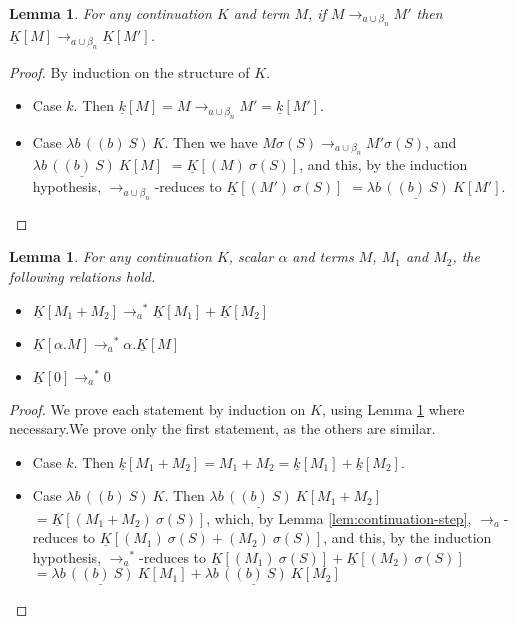 \documentclass{LMCS}
\newtheorem{lemma}[theorem]{Lemma}
\newcommand{\xto}[1]{\ensuremath{\rightarrow_{#1}}}
\newcommand{\toalgred}{\xto{a}}
\newcommand{\stoalgred}{\ensuremath{\xto{a}^{\ast}}}
\newcommand{\tobalgred}{\xto{a\cup\beta_n}}
\begin{document}
\begin{lemma}
  \label{lem:continuation-step-a}For any continuation $K$ and term
  $M$, if $M\tobalgred M'$ then $\underline{K}[M]\tobalgred\underline{K}[M']$.
\end{lemma}
\begin{proof}
  By induction on the structure of $K$.
  \begin{itemize}
    \item Case $k$. Then $\underline{k}[M]=M\tobalgred M'=\underline{k}[M']$.
    \item Case $\lambda b\,((b)~S)~K$. Then we have $M\sigma(S)\tobalgred M'\sigma(S)$, and 
      $\underline{\lambda b\,((b)~S)~K}[M]$
      $=\underline{K}[(M)~\sigma(S)]$,
      and this, by the induction hypothesis, \tobalgred-reduces to 
      $\underline{K}[(M')~\sigma(S)]$
      $=\underline{\lambda b\,((b)~S)~K}[M']$.
      \qedhere
  \end{itemize}
\end{proof}

\begin{lemma}
  \label{lem:continuation-linearity-a}
  For any continuation $K$, scalar $\alpha$ and terms $M$, $M_1$ and $M_2$, the following relations hold.
  \begin{itemize}
    \item $\underline{K}[M_{1}+M_{2}]\stoalgred\underline{K}[M_{1}]+\underline{K}[M_{2}]$
    \item $\underline{K}[\alpha.M]\stoalgred\alpha.\underline{K}[M]$
    \item $\underline{K}[0]\stoalgred0$
  \end{itemize}
\end{lemma}

\begin{proof}
  We prove each statement by induction on $K$, using Lemma \ref{lem:continuation-step-a}
  where necessary.We prove only the first statement, as the others
  are similar.
  \begin{itemize}
    \item Case $k$. Then $\underline{k}[M_{1}+M_{2}]=M_{1}+M_{2}=\underline{k}[M_{1}]+\underline{k}[M_{2}]$.
    \item Case $\lambda b\,((b)~S)~K$. Then 
      $\underline{\lambda b\,((b)~S)~K}[M_{1}+M_{2}]$
      $=\underline{K}[(M_{1}+M_{2})~\sigma(S)]$,
      which, by Lemma \ref{lem:continuation-step}, \toalgred-reduces to
      $\underline{K}[(M_{1})~\sigma(S)+(M_{2})~\sigma(S)]$,
      and this, by the induction hypothesis, \stoalgred-reduces to
      $\underline{K}[(M_{1})~\sigma(S)]+\underline{K}[(M_{2})~\sigma(S)]$
      $=\underline{\lambda b\,((b)~S)~K}[M_{1}]+\underline{\lambda b\,((b)~S)~K}[M_{2}]$
      \qedhere
  \end{itemize}
\end{proof}
\end{document}
